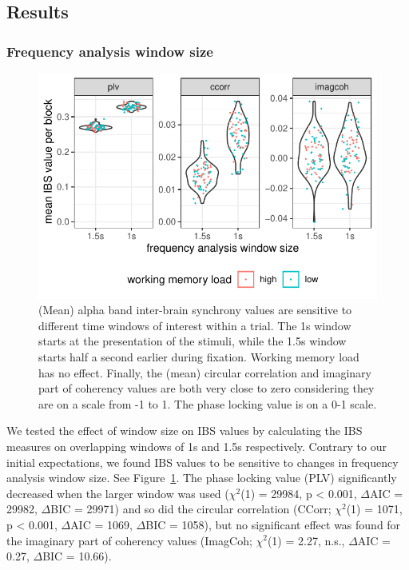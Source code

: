 \subsection{Results}

\subsubsection{Frequency analysis window size}

\begin{figure}[!htpb]
  \includegraphics[width=\linewidth]{../stats/results/winsize.pdf}
  \caption{(Mean) alpha band inter-brain synchrony values are sensitive to different time windows of interest within a trial. The 1s window starts at the presentation of the stimuli, while the 1.5s window starts half a second earlier during fixation. Working memory load has no effect. Finally, the (mean) circular correlation and imaginary part of coherency values are both very close to zero considering they are on a scale from -1 to 1. The phase locking value is on a 0-1 scale.}
  \label{fig:winsize}
\end{figure}

We tested the effect of window size on IBS values by calculating the IBS
measures on overlapping windows of 1s and 1.5s respectively. Contrary to our
initial expectations, we found IBS values to be sensitive to changes
in frequency analysis window size. See Figure~\ref{fig:winsize}. The phase
locking value (PLV) significantly decreased when the larger window was used
($\chi^2$(1) = 29984, p < 0.001, $\Delta$AIC = 29982, $\Delta$BIC = 29971) and
so did the circular correlation (CCorr; $\chi^2$(1) = 1071, p < 0.001, $\Delta$AIC = 1069,
$\Delta$BIC = 1058), but no significant effect was found for the imaginary part
of coherency values (ImagCoh; $\chi^2$(1) = 2.27, n.s., $\Delta$AIC = 0.27,
$\Delta$BIC = 10.66).

